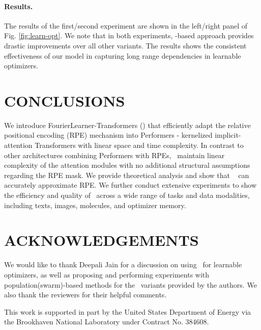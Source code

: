 \paragraph{Results.} 
The results of the first/second experiment are shown in the left/right panel of Fig. \ref{fig:learn-opt}. We note that in both experiments, \FLT-based approach provides drastic improvements over all other variants. The results shows the consistent effectiveness of our model in capturing long range dependencies in learnable optimizers. 

\section{CONCLUSIONS}
\label{sec:conclusion}
We introduce \textrm{FourierLearner-Transformers} (\FLTs) that efficiently adapt the relative positional encoding (RPE) mechanism into Performers - kernelized implicit-attention Transformers with linear space and time complexity. 
In contrast to other architectures combining Performers with RPEs, \FLTs~maintain linear complexity of the attention modules with no additional structural assumptions regarding the RPE mask. 
We provide theoretical analysis and show that \FLTs~ can accurately approximate RPE. 
We further conduct extensive experiments to show the efficiency and quality of \FLTs~across a wide range of tasks and data modalities, including texts, images, molecules, and optimizer memory.
\section*{ACKNOWLEDGEMENTS}
\label{sec:ac}

We would like to thank Deepali Jain for a discussion on using \FLT~for learnable optimizers, as well as proposing and performing experiments with population(swarm)-based methods for the \FLT~variants provided by the authors. We also thank the reviewers for their helpful comments.

This work is supported in part by the United States Department of Energy via the Brookhaven National Laboratory under Contract No. 384608.

